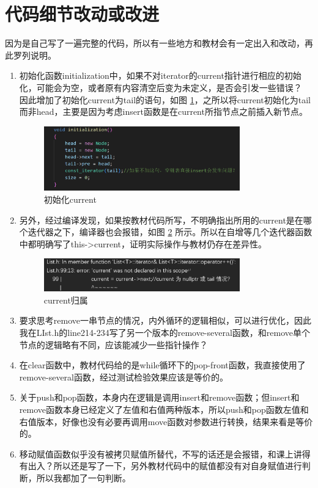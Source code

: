 \documentclass[UTF8]{ctexart}
\begin{document}
\section{代码细节改动或改进}
    因为是自己写了一遍完整的代码，所以有一些地方和教材会有一定出入和改动，再此罗列说明。
\begin{enumerate}
    \item 初始化函数initialization中，如果不对iterator的current指针进行相应的初始化，可能会为空，或者原有内容清空后变为未定义，是否会引发一些错误？
    因此增加了初始化current为tail的语句，如图 \ref{fig:initialize}，之所以将current初始化为tail而非head，主要是因为考虑insert函数是在current所指节点之前插入新节点。
    \begin{figure}[h]
        \centering
        \includegraphics[width=0.8\textwidth]{初始化current.png} 
        \caption{初始化current}
        \label{fig:initialize}
    \end{figure}

    \item 另外，经过编译发现，如果按教材代码所写，不明确指出所用的current是在哪个迭代器之下，编译器也会报错，如图 \ref{fig:iterator} 所示。所以在自增等几个迭代器函数中都明确写了this->current，证明实际操作与教材仍存在差异性。
    \begin{figure}[h]
        \centering
        \includegraphics[width=0.8\textwidth]{current归属.png} 
        \caption{current归属}
        \label{fig:iterator}
    \end{figure}

    \item 要求思考remove一串节点的情况，内外循环的逻辑相似，可以进行优化，因此我在LIst.h的line214-234写了另一个版本的remove-several函数，和remove单个节点的逻辑略有不同，应该能减少一些指针操作？
    \item 在clear函数中，教材代码给的是while循环下的pop-front函数，我直接使用了remove-several函数，经过测试检验效果应该是等价的。
    \item 关于push和pop函数，本身内在逻辑是调用insert和remove函数；但insert和remove函数本身已经定义了左值和右值两种版本，所以push和pop函数左值和右值版本，好像也没有必要再调用move函数对参数进行转换，结果来看是等价的。
    \item 移动赋值函数似乎没有被拷贝赋值所替代，不写的话还是会报错，和课上讲得有出入？所以还是写了一下，另外教材代码中的赋值都没有对自身赋值进行判断，所以我都加了一句判断。
\end{enumerate}
\end{document}
